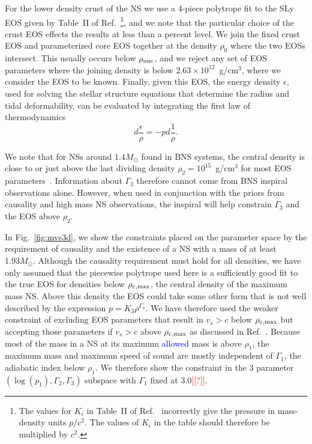 \documentclass[twocolumn,prd,amssymb,aps,nofootinbib,showpacs,epsf]{revtex4}
\newcommand{\red}{\textcolor{red}}
\newcommand\les[2]{\textcolor{blue}{{#1}\sout{#2}}}
\begin{document}
For the lower density crust of the NS we use a 4-piece polytrope fit to the SLy EOS given by Table~II of Ref.~\cite{ReadLackey2009}\footnote{The values for $K_i$ in Table~II of Ref.~\cite{ReadLackey2009} incorrectly give the pressure in mass-density units $p/c^2$. The values of $K_i$ in the table should therefore be multiplied by $c^2$.}, and we note that the particular choice of the crust EOS effects the results at less than a percent level. We join the fixed crust EOS and parameterized core EOS together at the density $\rho_0$ where the two EOSs intersect. This usually occurs below $\rho_{\rm nuc}$, and we reject any set of EOS parameters where the joining density is below $2.63\times 10^{12}$~g/cm$^3$, where we consider the EOS to be known. Finally, given this EOS, the energy density $\epsilon$, used for solving the stellar structure equations that determine the radius and tidal deformability, can be evaluated by integrating the first law of thermodynamics
\begin{equation}
d\frac{\epsilon}{\rho} = - p d\frac{1}{\rho}.
\end{equation}

We note that for NSs around $1.4M_\odot$ found in BNS systems, the central density is close to or just above the last dividing density $\rho_2 = 10^{15}$~g/cm$^3$ for most EOS parameters~\cite{ReadLackey2009}. Information about $\Gamma_3$ therefore cannot come from BNS inspiral observations alone. However, when used in conjunction with the priors from causality and high mass NS observations, the inspiral will help constrain $\Gamma_3$ and the EOS above $\rho_2$.

In Fig.~\ref{fig:mvs3d}, we show the constraints placed on the parameter space by the requirement of causality and the existence of a NS with a mass of at least $1.93M_\odot$. Although the causality requirement must hold for all densities, we have only assumed that the piecewise polytrope used here is a sufficiently good fit to the true EOS for densities below $\rho_{\rm c, max}$, the central density of the maximum mass NS. Above this density the EOS could take some other form that is not well described by the expression $p = K_3 \rho^{\Gamma_3}$. We have therefore used the weaker constraint of excluding EOS parameters that result in $v_s > c$ below $\rho_{\rm c, max}$ but accepting those parameters if $v_s > c$ above $\rho_{\rm c, max}$ as discussed in Ref.~\cite{ReadLackey2009}. Because most of the mass in a NS at its maximum \les{allowed}{} mass is above $\rho_1$, the maximum mass and maximum speed of sound are mostly independent of $\Gamma_1$, the adiabatic index below $\rho_1$. We therefore show the constraint in the 3 parameter $(\log(p_1), \Gamma_2, \Gamma_3)$ subspace with $\Gamma_1$ fixed at 3.0\red{[[?]]}. 
\end{document}
